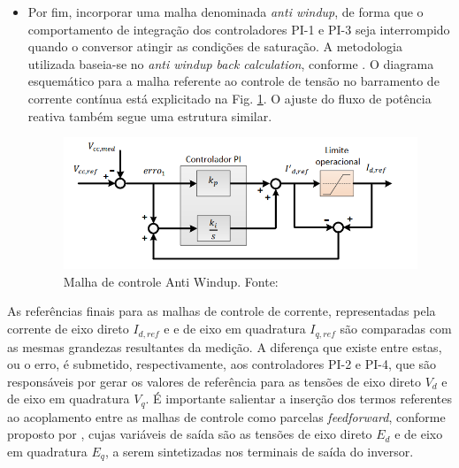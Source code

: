 \begin{itemize}
	\item Por fim, incorporar uma malha denominada \textit{anti windup}, de forma que o comportamento de integração dos controladores PI-1 e PI-3 seja interrompido quando o conversor atingir as condições de saturação. A metodologia utilizada baseia-se no \textit{anti windup back calculation}, conforme \cite{astrom2006advanced}. O diagrama esquemático para a malha referente ao controle de tensão no barramento de corrente contínua está explicitado na Fig. \ref{fig:Malha_anti_windup}. O ajuste do fluxo de potência reativa também segue uma estrutura similar. 
	
	\begin{figure}[!hbt]
		\begin{center}
			\includegraphics[width=\columnwidth]{figuras/Malha_Anti_Windup.PNG}
			\caption{Malha de controle Anti Windup. Fonte: \cite{TeseProfAlex}}
			\label{fig:Malha_anti_windup}
		\end{center}
	\end{figure}
	
	
\end{itemize}

As referências finais para as malhas de controle de corrente, representadas pela corrente de eixo direto $I_{d,ref}$ e  e de eixo em quadratura $I_{q,ref}$ são comparadas com as mesmas grandezas resultantes da medição. A diferença que existe entre estas, ou o erro, é submetido, respectivamente, aos controladores PI-2 e PI-4, que são responsáveis por gerar os valores de referência para as tensões de eixo direto $V_d$ e de eixo em quadratura $V_q$. É importante salientar a inserção dos termos referentes ao acoplamento entre as malhas de controle como parcelas \textit{feedforward}, conforme proposto por \cite{astrom2006advanced}, cujas variáveis de saída são as tensões de eixo direto $E_d$ e de eixo em quadratura $E_q$, a serem sintetizadas nos terminais de saída do inversor. 

